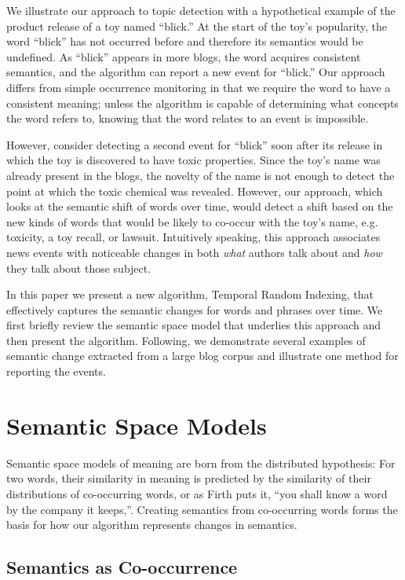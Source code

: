 \documentclass[a4paper,twocolumn,twoside,10pt]{ranlp}
\begin{document}
We illustrate our approach to topic detection with a hypothetical example of the
product release of a toy named ``blick.''  At the start of the toy's popularity,
the word ``blick'' has not occurred before and therefore its semantics would be
undefined.
%
As ``blick'' appears in more blogs, the word acquires consistent semantics, and
the algorithm can report a new event for ``blick.''  Our approach differs from
simple occurrence monitoring in that we require the word to have a consistent
meaning; unless the algorithm is capable of determining what concepts the word
refers to, knowing that the word relates to an event is impossible.

However, consider detecting a second event for ``blick'' soon after its release
in which the toy is discovered to have toxic properties.  Since the toy's name
was already present in the blogs, the novelty of the name is not enough to
detect the point at which the toxic chemical was revealed.  However, our
approach, which looks at the semantic shift of words over time, would detect a
shift based on the new kinds of words that would be likely to co-occur with the
toy's name, e.g. toxicity, a toy recall, or lawsuit.  Intuitively speaking, this
approach associates news events with noticeable changes in both \emph{what}
authors talk about and \emph{how} they talk about those subject.

In this paper we present a new algorithm, Temporal Random Indexing, that
effectively captures the semantic changes for words and phrases over time.  We
first briefly review the semantic space model that underlies this approach and
then present the algorithm.  Following, we demonstrate several examples of
semantic change extracted from a large blog corpus and illustrate one method for
reporting the events.  

\section {Semantic Space Models}

Semantic space models of meaning are born from the distributed hypothesis: For
two words, their similarity in meaning is predicted by the similarity of their
distributions of co-occurring words\cite{harris68mathematical}, or as Firth puts
it, ``you shall know a word by the company it keeps,''\cite{firth57synopsis}.
Creating semantics from co-occurring words forms the basis for how our algorithm
represents changes in semantics.

\subsection{Semantics as Co-occurrence}
\end{document}
